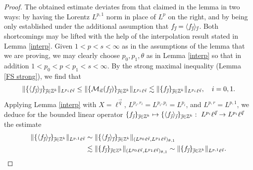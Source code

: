 \documentclass[11pt, reqno]{amsart}
\theoremstyle{definition}
\theoremstyle{remark}
\numberwithin{equation}{section}
\newcommand{\vj}{\vec{\textit{\j}}}
\newcommand{\vn}{\vec n}
\newcommand{\vq}{\vec q}
\newcommand{\Avee}[2]{\langle#1\rangle_{#2}}
\newcommand{\Norm}[2]{\|#1\|_{#2}}
\begin{document}
\begin{proof}
The obtained estimate deviates from that claimed in the lemma in two ways: by having the Lorentz $L^{p,1}$ norm in place of $L^p$ on the right,
and by being only established under the additional assumption that $f_{\vj}=\Avee{f_{\vj} }{\vj}$. Both shortcomings may be lifted with the help of the interpolation result stated in Lemma \ref{interp}. Given $1<p<s<\infty$ as in the assumptions of the lemma that we are proving, we may clearly choose $p_0,p_1,\theta$ as in Lemma \ref{interp} so that in addition $1<p_0<p<p_1<s<\infty$. By the strong maximal inequality (Lemma \ref{FS strong}), we find that
\begin{equation*}
\Norm{\{\Avee{f_{\vj}}{\vj}\}_{\vj\in\mathbb Z^k}}{L^{p_i}\ell^{\vq}}
\leq \Norm{\{\mathcal M_{\vn}(f_{\vj})\}_{\vj\in\mathbb Z^k}}{L^{p_i}\ell^{\vq}}
\lesssim\Norm{\{f_{\vj}\}_{\vj\in\mathbb Z^k}}{L^{p_i}\ell^{\vq}},\quad i=0,1.
\end{equation*}
Applying Lemma \ref{interp} with $X=\ell^{\vq}$, $L^{p_i,r_i}=L^{p_i,p_i}=L^{p_i}$, and $L^{p,r}=L^{p,1}$, we deduce for the bounded linear operator $\{f_{\vj}\}_{\vj\in\mathbb Z^k}\mapsto\{\Avee{f_{\vj}}{\vj}\}_{\vj\in\mathbb Z^k}:\ L^{p_i}\ell^{\vq}\to L^{p_i}\ell^{\vq}$ the estimate
\begin{equation}\label{carl 13}
\begin{split}
\Norm{\{\Avee{f_{\vj}}{\vj}\}_{\vj\in\mathbb Z^k}}{L^{p,1}\ell^{\vq}}
&\sim\Norm{\{\Avee{f_{\vj}}{\vj}\}_{\vj\in\mathbb Z^k}}{(L^{p_0}\ell^{\vq},L^{p_1}\ell^{\vq})_{\theta,1}} \\
&\lesssim\Norm{\{f_{\vj}\}_{\vj\in\mathbb Z^k}}{(L^{p_0}\ell^{\vq},L^{p_1}\ell^{\vq})_{\theta,1}}
\sim\Norm{\{f_{\vj}\}_{\vj\in\mathbb Z^k}}{L^{p,1}\ell^{\vq}}.
\end{split}
\end{equation}


\end{proof}
\end{document}
